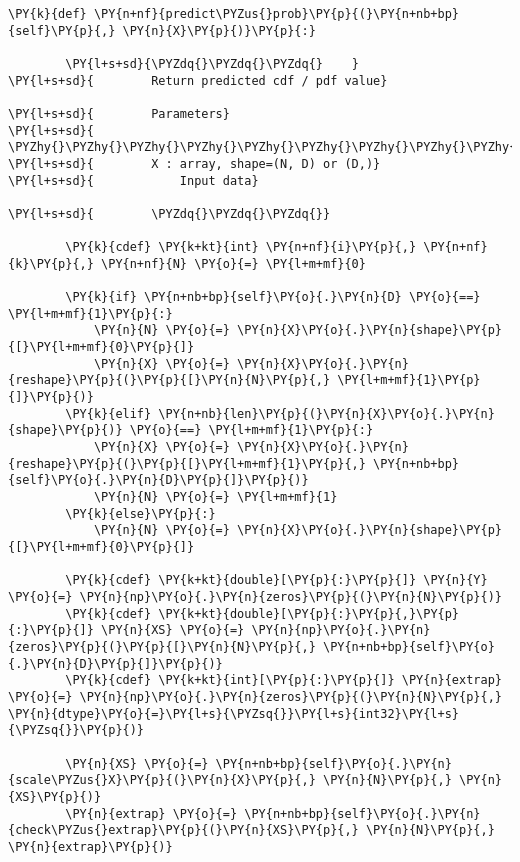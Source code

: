 \begin{Verbatim}[commandchars=\\\{\}]
    \PY{k}{def} \PY{n+nf}{predict\PYZus{}prob}\PY{p}{(}\PY{n+nb+bp}{self}\PY{p}{,} \PY{n}{X}\PY{p}{)}\PY{p}{:}
        
        \PY{l+s+sd}{\PYZdq{}\PYZdq{}\PYZdq{}    }
\PY{l+s+sd}{        Return predicted cdf / pdf value}

\PY{l+s+sd}{        Parameters}
\PY{l+s+sd}{        \PYZhy{}\PYZhy{}\PYZhy{}\PYZhy{}\PYZhy{}\PYZhy{}\PYZhy{}\PYZhy{}\PYZhy{}\PYZhy{}\PYZhy{}}
\PY{l+s+sd}{        X : array, shape=(N, D) or (D,)}
\PY{l+s+sd}{            Input data}

\PY{l+s+sd}{        \PYZdq{}\PYZdq{}\PYZdq{}}
        
        \PY{k}{cdef} \PY{k+kt}{int} \PY{n+nf}{i}\PY{p}{,} \PY{n+nf}{k}\PY{p}{,} \PY{n+nf}{N} \PY{o}{=} \PY{l+m+mf}{0}

        \PY{k}{if} \PY{n+nb+bp}{self}\PY{o}{.}\PY{n}{D} \PY{o}{==} \PY{l+m+mf}{1}\PY{p}{:}
            \PY{n}{N} \PY{o}{=} \PY{n}{X}\PY{o}{.}\PY{n}{shape}\PY{p}{[}\PY{l+m+mf}{0}\PY{p}{]}
            \PY{n}{X} \PY{o}{=} \PY{n}{X}\PY{o}{.}\PY{n}{reshape}\PY{p}{(}\PY{p}{[}\PY{n}{N}\PY{p}{,} \PY{l+m+mf}{1}\PY{p}{]}\PY{p}{)}
        \PY{k}{elif} \PY{n+nb}{len}\PY{p}{(}\PY{n}{X}\PY{o}{.}\PY{n}{shape}\PY{p}{)} \PY{o}{==} \PY{l+m+mf}{1}\PY{p}{:}
            \PY{n}{X} \PY{o}{=} \PY{n}{X}\PY{o}{.}\PY{n}{reshape}\PY{p}{(}\PY{p}{[}\PY{l+m+mf}{1}\PY{p}{,} \PY{n+nb+bp}{self}\PY{o}{.}\PY{n}{D}\PY{p}{]}\PY{p}{)}
            \PY{n}{N} \PY{o}{=} \PY{l+m+mf}{1}
        \PY{k}{else}\PY{p}{:}
            \PY{n}{N} \PY{o}{=} \PY{n}{X}\PY{o}{.}\PY{n}{shape}\PY{p}{[}\PY{l+m+mf}{0}\PY{p}{]}

        \PY{k}{cdef} \PY{k+kt}{double}[\PY{p}{:}\PY{p}{]} \PY{n}{Y} \PY{o}{=} \PY{n}{np}\PY{o}{.}\PY{n}{zeros}\PY{p}{(}\PY{n}{N}\PY{p}{)}
        \PY{k}{cdef} \PY{k+kt}{double}[\PY{p}{:}\PY{p}{,}\PY{p}{:}\PY{p}{]} \PY{n}{XS} \PY{o}{=} \PY{n}{np}\PY{o}{.}\PY{n}{zeros}\PY{p}{(}\PY{p}{[}\PY{n}{N}\PY{p}{,} \PY{n+nb+bp}{self}\PY{o}{.}\PY{n}{D}\PY{p}{]}\PY{p}{)}
        \PY{k}{cdef} \PY{k+kt}{int}[\PY{p}{:}\PY{p}{]} \PY{n}{extrap} \PY{o}{=} \PY{n}{np}\PY{o}{.}\PY{n}{zeros}\PY{p}{(}\PY{n}{N}\PY{p}{,} \PY{n}{dtype}\PY{o}{=}\PY{l+s}{\PYZsq{}}\PY{l+s}{int32}\PY{l+s}{\PYZsq{}}\PY{p}{)}
        
        \PY{n}{XS} \PY{o}{=} \PY{n+nb+bp}{self}\PY{o}{.}\PY{n}{scale\PYZus{}X}\PY{p}{(}\PY{n}{X}\PY{p}{,} \PY{n}{N}\PY{p}{,} \PY{n}{XS}\PY{p}{)} 
        \PY{n}{extrap} \PY{o}{=} \PY{n+nb+bp}{self}\PY{o}{.}\PY{n}{check\PYZus{}extrap}\PY{p}{(}\PY{n}{XS}\PY{p}{,} \PY{n}{N}\PY{p}{,} \PY{n}{extrap}\PY{p}{)}
        

\end{Verbatim}
